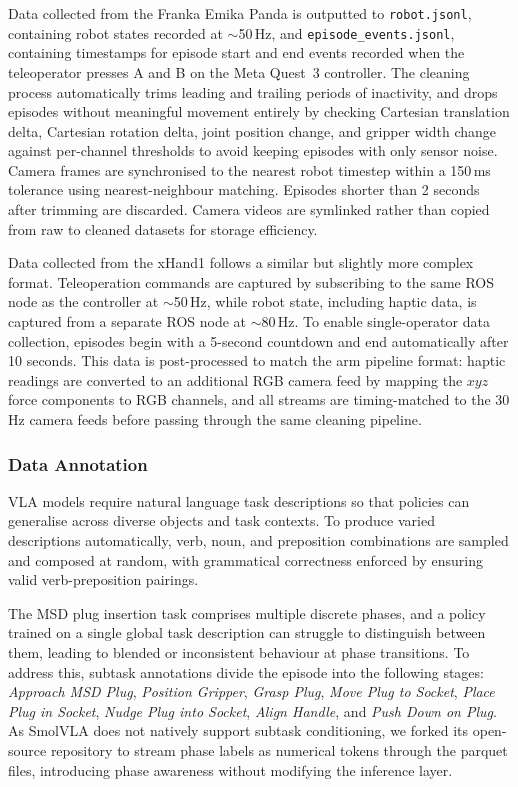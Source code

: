 \documentclass[conference]{IEEEtran}
\begin{document}
Data collected from the Franka Emika Panda is outputted to \texttt{robot.jsonl}, containing robot states recorded at $\sim$50\,Hz, and \texttt{episode\_events.jsonl}, containing timestamps for episode start and end events recorded when the teleoperator presses A and B on the Meta Quest~3 controller. The cleaning process automatically trims leading and trailing periods of inactivity, and drops episodes without meaningful movement entirely by checking Cartesian translation delta, Cartesian rotation delta, joint position change, and gripper width change against per-channel thresholds to avoid keeping episodes with only sensor noise. Camera frames are synchronised to the nearest robot timestep within a 150\,ms tolerance using nearest-neighbour matching. Episodes shorter than 2 seconds after trimming are discarded. Camera videos are symlinked rather than copied from raw to cleaned datasets for storage efficiency.

Data collected from the xHand1 follows a similar but slightly more complex format. Teleoperation commands are captured by subscribing to the same ROS node as the controller at $\sim$50\,Hz, while robot state, including haptic data, is captured from a separate ROS node at $\sim$80\,Hz. To enable single-operator data collection, episodes begin with a 5-second countdown and end automatically after 10 seconds. This data is post-processed to match the arm pipeline format: haptic readings are converted to an additional RGB camera feed by mapping the $xyz$ force components to RGB channels, and all streams are timing-matched to the 30\,Hz camera feeds before passing through the same cleaning pipeline.

\subsubsection{Data Annotation}
\label{subsubsection:data_annotation}

VLA models require natural language task descriptions so that policies can generalise across diverse objects and task contexts. To produce varied descriptions automatically, verb, noun, and preposition combinations are sampled and composed at random, with grammatical correctness enforced by ensuring valid verb-preposition pairings.

The MSD plug insertion task comprises multiple discrete phases, and a policy trained on a single global task description can struggle to distinguish between them, leading to blended or inconsistent behaviour at phase transitions. To address this, subtask annotations divide the episode into the following stages: \textit{Approach MSD Plug}, \textit{Position Gripper}, \textit{Grasp Plug}, \textit{Move Plug to Socket}, \textit{Place Plug in Socket}, \textit{Nudge Plug into Socket}, \textit{Align Handle}, and \textit{Push Down on Plug}. As SmolVLA does not natively support subtask conditioning, we forked its open-source repository to stream phase labels as numerical tokens through the parquet files, introducing phase awareness without modifying the inference layer.
\end{document}
